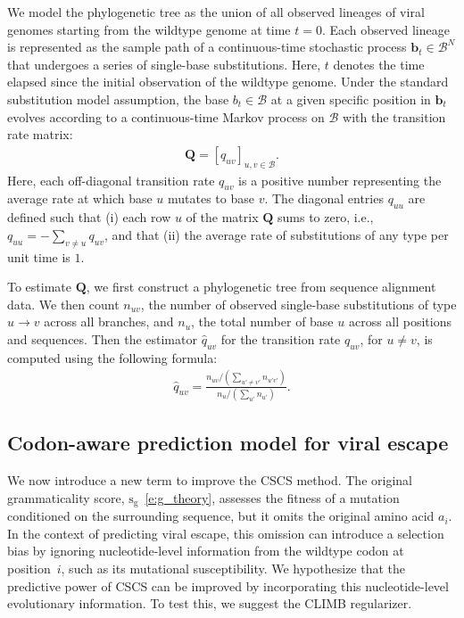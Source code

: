 \documentclass[pdflatex,sn-nature]{sn-jnl}
\begin{document}
We model the phylogenetic tree as the union of all observed lineages of viral genomes starting from the wildtype genome at time $t = 0$. Each observed lineage is represented as the sample path of a continuous-time stochastic process $\mathbf{b}_t \in \mathcal{B}^N$ that undergoes a series of single-base substitutions.
Here, $t$ denotes the time elapsed since the initial observation of the wildtype genome.
Under the standard substitution model assumption, the base $b_t \in \mathcal{B}$ at a given specific position in $\mathbf{b}_t$ evolves according to a continuous-time Markov process on $\mathcal{B}$ with the transition rate matrix:
\begin{align}
    \mathbf{Q} = [q_{uv}]_{u,v \in \mathcal{B}}.
\end{align}
%
Here, each off-diagonal transition rate $q_{uv}$ is a positive number representing the average rate at which base $u$ mutates to base $v$. The diagonal entries $q_{uu}$ are defined such that (i) each row $u$ of the matrix $\mathbf{Q}$ sums to zero, i.e., $q_{uu} = -\sum_{v\neq u} q_{uv}$, and that (ii) the average rate of substitutions of any type per unit time is $1$.

To estimate $\mathbf{Q}$, we first construct a phylogenetic tree from sequence alignment data.
We then count $n_{uv}$, the number of observed single-base substitutions of type $u \to v$ across all branches, and $n_u$, the total number of base $u$ across all positions and sequences.
Then the estimator $\hat{q}_{uv}$ for the transition rate $q_{uv}$, for $u \neq v$, is computed using the following formula:
\begin{align}
    \hat{q}_{uv} = \frac{n_{uv} / (\sum_{u' \neq v'} n_{u'v'})}{n_u / (\sum_{u'} n_{u'})}.
\end{align}


%
\subsection*{Codon-aware prediction model for viral escape}


We now introduce a new term to improve the CSCS method.
%
The original grammaticality score, $\mathrm{s}_\text{g}$~\eqref{e:g_theory}, assesses the fitness of a mutation conditioned on the surrounding sequence, but it omits the original amino acid $a_i$.
In the context of predicting viral escape, this omission can introduce a selection bias by ignoring nucleotide-level information from the wildtype codon at position~$i$, such as its mutational susceptibility.
We hypothesize that the predictive power of CSCS can be improved by incorporating this nucleotide-level evolutionary information.
To test this, we suggest the CLIMB regularizer.
\end{document}
